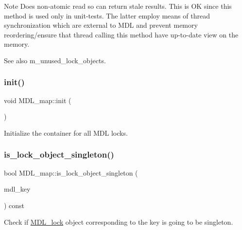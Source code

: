 \begin{DoxyNote}{Note}
Does non-\/atomic read so can return stale results. This is OK since this method is used only in unit-\/tests. The latter employ means of thread synchronization which are external to M\+DL and prevent memory reordering/ensure that thread calling this method have up-\/to-\/date view on the memory. 
\end{DoxyNote}
\begin{DoxySeeAlso}{See also}
m\+\_\+unused\+\_\+lock\+\_\+objects. 
\end{DoxySeeAlso}
\mbox{\label{classMDL__map_aa98c33d4b7deccff3e9b2e5defed7928}} 
\subsubsection{\texorpdfstring{init()}{init()}}
{\footnotesize\ttfamily void M\+D\+L\+\_\+map\+::init (\begin{DoxyParamCaption}{ }\end{DoxyParamCaption})}

Initialize the container for all M\+DL locks. \mbox{\label{classMDL__map_a7ecc606e53a2b8bfa5714dcba3e795f2}} 
\subsubsection{\texorpdfstring{is\+\_\+lock\+\_\+object\+\_\+singleton()}{is\_lock\_object\_singleton()}}
{\footnotesize\ttfamily bool M\+D\+L\+\_\+map\+::is\+\_\+lock\+\_\+object\+\_\+singleton (\begin{DoxyParamCaption}\item[{const \mbox{\hyperlink{structMDL__key}{M\+D\+L\+\_\+key}} $\ast$}]{mdl\+\_\+key }\end{DoxyParamCaption}) const\hspace{0.3cm}{\ttfamily [inline]}}

Check if \mbox{\hyperlink{classMDL__lock}{M\+D\+L\+\_\+lock}} object corresponding to the key is going to be singleton. \mbox{\label{classMDL__map_a4451a25836d0e6fc7be87e33c8f9d0ec}} 
